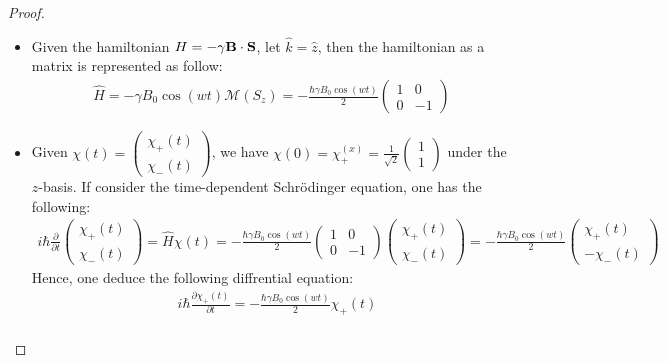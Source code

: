 \documentclass{article}
\begin{document}
\begin{proof}
    \begin{itemize}
        \item[(a)] Given the hamiltonian $H = -\gamma \mathbf{B}\cdot \mathbf{S}$, let $\hat{k} = \hat{z}$, then the hamiltonian as a matrix is represented as follow:
        \begin{align}
            \hat{H} = -\gamma B_0\cos(wt) \mathcal{M}(S_z) = -\frac{\hbar \gamma B_0 \cos(wt)}{2}\begin{pmatrix}
                1&0\\0&-1
            \end{pmatrix} 
        \end{align}

        \hfil

        \item[(b)] Given $\chi(t)=\begin{pmatrix}\chi_+(t)\\\chi_-(t)\end{pmatrix}$, we have $\chi(0) = \chi_+^{(x)} = \frac{1}{\sqrt{2}}\begin{pmatrix}
            1\\1
        \end{pmatrix}$ under the $z$-basis. If consider the time-dependent Schr\"odinger equation, one has the following:
        \begin{align}
            i\hbar\frac{\partial}{\partial t}\begin{pmatrix}\chi_+(t)\\\chi_-(t)\end{pmatrix} = \hat{H}\chi(t) = -\frac{\hbar\gamma B_0\cos(wt)}{2}\begin{pmatrix}
                1&0\\0&-1
            \end{pmatrix}\begin{pmatrix}
                \chi_+(t)\\\chi_-(t)
            \end{pmatrix} = -\frac{\hbar\gamma B_0\cos(wt)}{2}\begin{pmatrix}
                \chi_+(t)\\-\chi_-(t)
            \end{pmatrix}
        \end{align}
        Hence, one deduce the following diffrential equation:
        \begin{align}
            &i\hbar\frac{\partial\chi_+(t)}{\partial t} = -\frac{\hbar\gamma B_0\cos(wt)}{2}\chi_+(t)\\

\end{align}
\end{itemize}
\end{proof}
\end{document}
